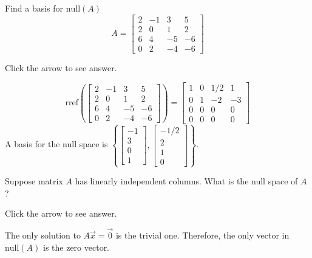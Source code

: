 \documentclass{ximera}
\begin{document}
\begin{problem}\label{prb:5.38} Find a basis for $\mbox{null} \left(A \right)$
$$ A = \left[ \begin{array}{rrrr}
2 & -1 & 3 & 5 \\
2 & 0 & 1 & 2 \\
6 & 4 & -5 & -6 \\
0 & 2 & -4 & -6
\end{array} \right]$$

Click the arrow to see answer.

\begin{expandable}
 $$\text{rref}\left(\left[ \begin{array}{rrrr}
2 & -1 & 3 & 5 \\
2 & 0 & 1 & 2 \\
6 & 4 & -5 & -6 \\
0 & 2 & -4 & -6
\end{array} \right]\right)=
 \begin{bmatrix} 1 &0 &1/2 &1\\
 0 &1 &-2 &-3\\
 0& 0& 0& 0\\
 0& 0& 0& 0\end{bmatrix}
 $$  A basis for the null space is $\left\{\begin{bmatrix}
     -1\\3\\0\\1
 \end{bmatrix}, \begin{bmatrix}
     -1/2\\2\\1\\0
 \end{bmatrix}\right\}$.
\end{expandable}
\end{problem}

\begin{problem}\label{prob:nullZero}
Suppose matrix $A$ has linearly independent columns.  What is the null space of $A$?

Click the arrow to see answer.

\begin{expandable}
    The only solution to $A\vec{x}=\vec{0}$ is the trivial one.  Therefore, the only vector in $\text{null}(A)$ is the zero vector.
\end{expandable}
\end{problem}
\end{document}
